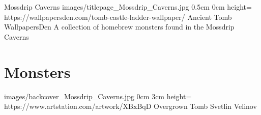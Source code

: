 \documentclass[letterpaper,openany,twoside,twocolumn]{book}
\begin{document}
	\bookTitlePage
		{Mossdrip Caverns}
		{images/titlepage_Mossdrip_Caverns.jpg}
		{0.5cm}
		{0cm}
		{height=\paperheight}
		{https://wallpapersden.com/tomb-castle-ladder-wallpaper/}
		{Ancient Tomb}
		{WallpapersDen}
		{A collection of homebrew monsters found in the Mossdrip Caverns}
	
	\tableofcontents
	
	\mainmatter
	
	\MonsterSheetGeometry
	\part{Monsters}
	
	
	\bookLastPage
		{images/backcover_Mossdrip_Caverns.jpg}
		{0cm}
		{3cm}
		{height=\paperheight}
		{https://www.artstation.com/artwork/XBxBqD}
		{Overgrown Tomb}
		{Svetlin Velinov}
		{}
\end{document}
